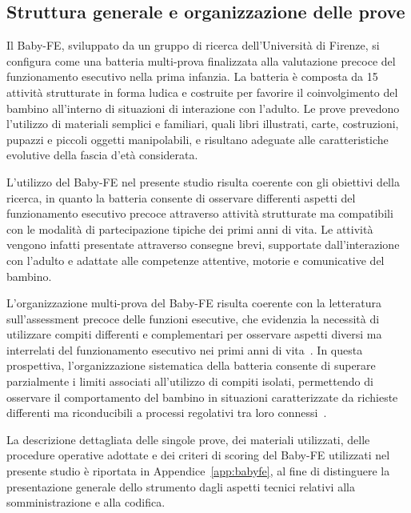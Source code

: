         \subsection{Struttura generale e organizzazione delle prove}
        \label{sec:3_7_3}

            Il Baby-FE, sviluppato da un gruppo di ricerca dell'Università di Firenze, si configura come una batteria multi-prova finalizzata alla valutazione precoce del funzionamento esecutivo nella prima infanzia. La batteria è composta da 15 attività strutturate in forma ludica e costruite per favorire il coinvolgimento del bambino all'interno di situazioni di interazione con l'adulto. Le prove prevedono l'utilizzo di materiali semplici e familiari, quali libri illustrati, carte, costruzioni, pupazzi e piccoli oggetti manipolabili, e risultano adeguate alle caratteristiche evolutive della fascia d'età considerata.

            L'utilizzo del Baby-FE nel presente studio risulta coerente con gli obiettivi della ricerca, in quanto la batteria consente di osservare differenti aspetti del funzionamento esecutivo precoce attraverso attività strutturate ma compatibili con le modalità di partecipazione tipiche dei primi anni di vita. Le attività vengono infatti presentate attraverso consegne brevi, supportate dall'interazione con l'adulto e adattate alle competenze attentive, motorie e comunicative del bambino.

            L'organizzazione multi-prova del Baby-FE risulta coerente con la letteratura sull'assessment precoce delle funzioni esecutive, che evidenzia la necessità di utilizzare compiti differenti e complementari per osservare aspetti diversi ma interrelati del funzionamento esecutivo nei primi anni di vita~\cite{garon2008,hughes2002}. In questa prospettiva, l'organizzazione sistematica della batteria consente di superare parzialmente i limiti associati all'utilizzo di compiti isolati, permettendo di osservare il comportamento del bambino in situazioni caratterizzate da richieste differenti ma riconducibili a processi regolativi tra loro connessi~\cite{hughes2002,miyake2012}.

            La descrizione dettagliata delle singole prove, dei materiali utilizzati, delle procedure operative adottate e dei criteri di scoring del Baby-FE utilizzati nel presente studio è riportata in Appendice~\ref{app:babyfe}, al fine di distinguere la presentazione generale dello strumento dagli aspetti tecnici relativi alla somministrazione e alla codifica.

